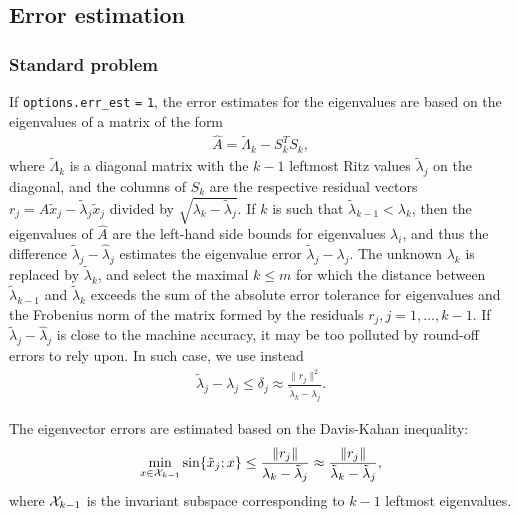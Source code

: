\subsection{Error estimation}

\label{sec:err.est}

\subsubsection{Standard problem}

If {\tt options.err\_est} {\tt =} {\tt 1}, 
the error estimates for the eigenvalues are based on 
the eigenvalues of a matrix of the form
%
\begin{eqnarray}
\label{L.mx}
\hat A = \tilde\Lambda_k - S_k^T S_k,
\end{eqnarray}
%
where $\tilde\Lambda_k$ is a diagonal matrix with
the $k-1$ leftmost Ritz values $\tilde\lambda_j$
on the diagonal,
and the columns of $S_k$ are the respective
residual vectors $r_j = A \tilde x_j - \tilde\lambda_j \tilde x_j$
divided by $\sqrt{\lambda_k - \tilde\lambda_j}$.
If $k$ is such that
$\tilde\lambda_{k-1} < \lambda_k$,
then the eigenvalues of $\hat A$ are
the left-hand side bounds for
eigenvalues $\lambda_i$,
and thus
the difference $\tilde\lambda_j - \hat\lambda_j$ estimates
the eigenvalue error $\tilde\lambda_j - \lambda_j$.
The unknown  $\lambda_k$ is replaced by $\tilde\lambda_k$,
and select the maximal $k \le m$ for which
the distance between $\tilde\lambda_{k-1}$ and $\tilde\lambda_k$
exceeds the sum of the absolute error tolerance for eigenvalues
and the Frobenius norm of the matrix formed by the residuals
$r_j, j = 1,\ldots,k-1$.
If  $\tilde\lambda_j - \hat\lambda_j$
is close to the machine accuracy, it may be too polluted
by round-off errors to rely upon.
In such case, we use instead
%
\begin{eqnarray}
\label{aL}
\tilde\lambda_j - \lambda_j \le \delta_j \approx
\frac{\|r_j\|^2}{\tilde\lambda_k - \lambda_j}.
\end{eqnarray}

The eigenvector errors are estimated based on 
the Davis-Kahan inequality:
%
\begin{eqnarray}
\label{DK}
\min_{x \in {\cal X}_{k-1}}
\sin\{\tilde x_j; x\} \le
\frac{\|r_j\|}{\lambda_k - \tilde\lambda_j} \approx
\frac{\|r_j\|}{\tilde\lambda_k - \tilde\lambda_j},
\end{eqnarray}
%
where ${\cal X}_{k-1}$ is the invariant subspace 
corresponding to $k-1$ leftmost eigenvalues.

